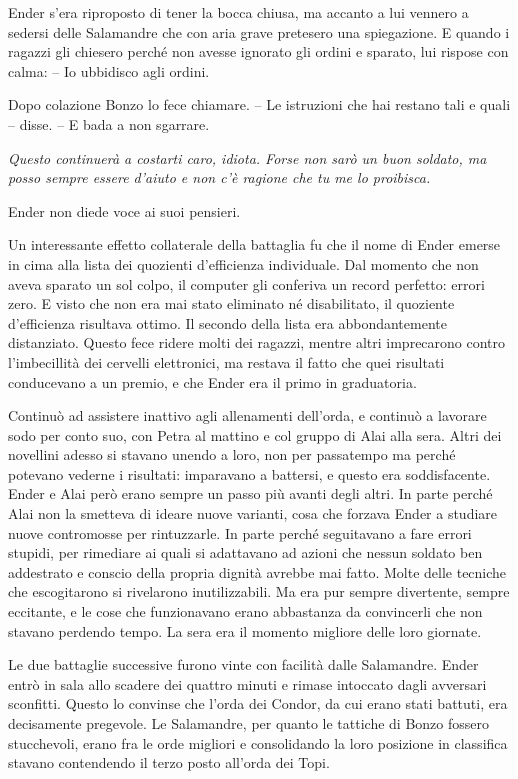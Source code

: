 {Ender s'era riproposto di tener la bocca chiusa, ma accanto a lui
	vennero a sedersi delle Salamandre che con aria grave pretesero una
	spiegazione. E quando i ragazzi gli chiesero perché non avesse ignorato
	gli ordini e sparato, lui rispose con calma: -- Io ubbidisco agli
	ordini.}

{Dopo colazione Bonzo lo fece chiamare. -- Le istruzioni che hai restano
	tali e quali -- disse. -- E bada a non sgarrare.}

\emph{{Questo continuerà a costarti caro, idiota. Forse non sarò un buon
		soldato, ma posso sempre essere d'aiuto e non c'è ragione che tu me lo
		proibisca.}}

{Ender non diede voce ai suoi pensieri.}

{Un interessante effetto collaterale della battaglia fu che il nome di
	Ender emerse in cima alla lista dei quozienti d'efficienza individuale.
	Dal momento che non aveva sparato un sol colpo, il computer gli
	conferiva un record perfetto: errori zero. E visto che non era mai stato
	eliminato né disabilitato, il quoziente d'efficienza risultava ottimo.
	Il secondo della lista era abbondantemente distanziato. Questo fece
	ridere molti dei ragazzi, mentre altri imprecarono contro l'imbecillità
	dei cervelli elettronici, ma restava il fatto che quei risultati
	conducevano a un premio, e che Ender era il primo in graduatoria.}

{Continuò ad assistere inattivo agli allenamenti dell'orda, e continuò a
	lavorare sodo per conto suo, con Petra al mattino e col gruppo di Alai
	alla sera. Altri dei novellini adesso si stavano unendo a loro, non per
	passatempo ma perché potevano vederne i risultati: imparavano a
	battersi, e questo era soddisfacente. Ender e Alai però erano sempre un
	passo più avanti degli altri. In parte perché Alai non la smetteva di
	ideare nuove varianti, cosa che forzava Ender a studiare nuove
	contromosse per rintuzzarle. In parte perché seguitavano a fare errori
	stupidi, per rimediare ai quali si adattavano ad azioni che nessun
	soldato ben addestrato e conscio della propria dignità avrebbe mai
	fatto. Molte delle tecniche che escogitarono si rivelarono
	inutilizzabili. Ma era pur sempre divertente, sempre eccitante, e le
	cose che funzionavano erano abbastanza da convincerli che non stavano
	perdendo tempo. La sera era il momento migliore delle loro giornate.}

{Le due battaglie successive furono vinte con facilità dalle Salamandre.
	Ender entrò in sala allo scadere dei quattro minuti e rimase intoccato
	dagli avversari sconfitti. Questo lo convinse che l'orda dei Condor, da
	cui erano stati battuti, era decisamente pregevole. Le Salamandre, per
	quanto le tattiche di Bonzo fossero stucchevoli, erano fra le orde
	migliori e consolidando la loro posizione in classifica stavano
	contendendo il terzo posto all'orda dei Topi.}

